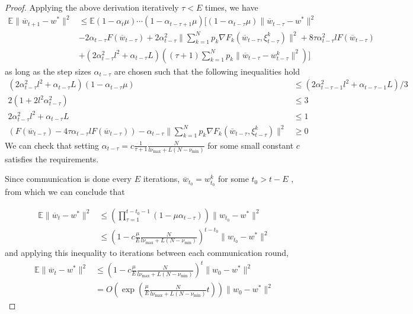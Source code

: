 \begin{proof}
	Applying the above derivation iteratively $\tau<E$ times, we have
	\begin{align*}
	\mathbb{E}\|\overline{w}_{t+1}-w^{\ast}\|^{2} & \leq\mathbb{E}(1-\alpha_{t}\mu)\cdots(1-\alpha_{t-\tau+1}\mu)[(1-\alpha_{t-\tau}\mu)\|\overline{w}_{t-\tau}-w^{\ast}\|^{2}\\
	& -2\alpha_{t-\tau}F(\overline{w}_{t-\tau})+2\alpha_{t-\tau}^{2}\|\sum_{k=1}^{N}p_{k}\nabla F_{k}(\overline{w}_{t-\tau},\xi_{t-\tau}^{k})\|^{2}+8\tau\alpha_{t-\tau}^{2}lF(\overline{w}_{t-\tau})\\
	& +(2\alpha_{t-\tau}^{2}l^{2}+\alpha_{t-\tau}L)((\tau+1)\sum_{k=1}^{N}p_{k}\|\overline{w}_{t-\tau}-w_{t-\tau}^{k}\|^{2})]
	\end{align*}
	as long as the step sizes $\alpha_{t-\tau}$ are chosen such that
	the following inequalities hold 
	\begin{align*}
	(2\alpha_{t-\tau}^{2}l^{2}+\alpha_{t-\tau}L)(1-\alpha_{t-\tau}\mu) & \leq(2\alpha_{t-\tau-1}^{2}l^{2}+\alpha_{t-\tau-1}L)/3\\
	2(1+2l^{2}\alpha_{t-\tau}^{2}) & \leq3\\
	2\alpha_{t-\tau}^{2}l^{2}+\alpha_{t-\tau}L & \leq1\\
	(F(\overline{w}_{t-\tau})-4\tau\alpha_{t-\tau}lF(\overline{w}_{t-\tau}))-\alpha_{t-\tau}\|\sum_{k=1}^{N}p_{k}\nabla F_{k}(\overline{w}_{t-\tau},\xi_{t-\tau}^{k})\|^{2} & \geq0
	\end{align*}
	We can check that setting $\alpha_{t-\tau}=c\frac{1}{\tau+1}\frac{N}{l\nu_{\max}+L(N-\nu_{\min})}$
	for some small constant $c$ satisfies the requirements. 
	
	Since communication is done every $E$ iterations, $\overline{w}_{t_{0}}=w_{t_{0}}^{k}$
	for some $t_{0}>t-E$ , from which we can conclude that 
	
	\begin{align*}
	\mathbb{E}\|\overline{w}_{t}-w^{\ast}\|^{2} & \leq(\prod_{\tau=1}^{t-t_{0}-1}(1-\mu\alpha_{t-\tau}))\|w_{t_{0}}-w^{\ast}\|^{2}\\
	& \leq(1-c\frac{\mu}{E}\frac{N}{l\nu_{\max}+L(N-\nu_{\min})})^{t-t_{0}}\|w_{t_{0}}-w^{\ast}\|^{2}
	\end{align*}
	and applying this inequality to iterations between each communication
	round, 
	\begin{align*}
	\mathbb{E}\|\overline{w}_{t}-w^{\ast}\|^{2} & \leq(1-c\frac{\mu}{E}\frac{N}{l\nu_{\max}+L(N-\nu_{\min})})^{t}\|w_{0}-w^{\ast}\|^{2}\\
	& =O(\exp(\frac{\mu}{E}\frac{N}{l\nu_{\max}+L(N-\nu_{\min})}t))\|w_{0}-w^{\ast}\|^{2}
	\end{align*}
	

\end{proof}
